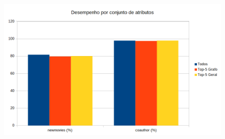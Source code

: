 \documentclass{beamer}
\begin{document}
%





\begin{frame}
	\begin{figure}[ht]
		\begin{center}
 	 	  \includegraphics[scale=0.5]{figuras/attrDesempenhoReal.png}	
		  \label{fig:fluxogramaAG}		
		\end{center}
	\end{figure}
\end{frame}


\end{document}
